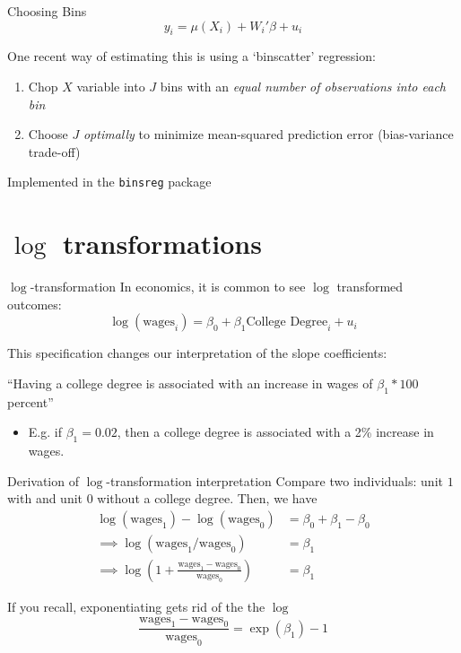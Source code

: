 \documentclass[aspectratio=169,t,11pt,table]{beamer}
\begin{document}
\begin{frame}{Choosing Bins}
  $$
    y_i = \mu(X_i) + W_i' \beta + u_i
  $$
  
  \bigskip
  One recent way of estimating this is using a `binscatter' regression:
  \begin{enumerate}
    \item Chop $X$ variable into $J$ bins with an \emph{equal number of observations into each bin}
    
    \item Choose $J$ \emph{optimally} to minimize mean-squared prediction error (bias-variance trade-off)
  \end{enumerate}

  \bigskip
  Implemented in the \texttt{binsreg} package
\end{frame}





\section{\texorpdfstring{$\log$}{log} transformations}

\begin{frame}{$\log$-transformation}
  In economics, it is common to see $\log$ transformed outcomes: 
  $$
    \log(\text{wages}_i) = \beta_0 + \beta_1 \text{College Degree}_i + u_i
  $$
  
  \pause
  \bigskip
  This specification changes our interpretation of the slope coefficients:

  \begin{tcolorbox}[boxrule = 0pt, frame hidden, sharp corners, enhanced, borderline west = {2pt}{0pt}{zinc600}, interior hidden]
    ``Having a college degree is associated with an increase in wages of $\beta_1 * 100$ percent''
  \end{tcolorbox}
  
  \begin{itemize}
    \item E.g. if $\beta_1 = 0.02$, then a college degree is associated with a 2\% increase in wages.
  \end{itemize}
\end{frame}

\begin{frame}{Derivation of $\log$-transformation interpretation}
  Compare two individuals: unit $1$ with and unit $0$ without a college degree. Then, we have 
  \begin{align*}
    \log(\text{wages}_1) - \log(\text{wages}_0) &= 
    \beta_0 + \beta_1 - \beta_0 \\[1em]
    \implies \log(\text{wages}_1 / \text{wages}_0) &= \beta_1 \\[1em]
    \implies \log(1 + \frac{\text{wages}_1 - \text{wages}_0}{\text{wages}_0}) &= \beta_1
  \end{align*}

  \pause
  \bigskip
  If you recall, exponentiating gets rid of the the $\log$
  $$
    \frac{\text{wages}_1 - \text{wages}_0}{\text{wages}_0} = \exp(\beta_1) - 1
  $$
\end{frame}
\end{document}
